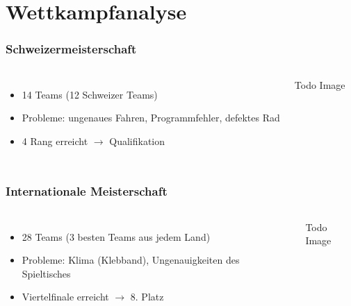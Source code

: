 \section{Wettkampfanalyse}

%	

\begin{frame}
	\frametitle{Schweizermeisterschaft}
	
	\begin{columns}[t]
		\begin{itemize}
			\item 14 Teams (12 Schweizer Teams)
			\item Probleme: ungenaues Fahren, Programmfehler, defektes Rad
			\item 4 Rang erreicht $\rightarrow$ Qualifikation
		\end{itemize}
		Todo Image
	\end{columns}
	
\end{frame}

\begin{frame}
	\frametitle{Internationale Meisterschaft}
	
	\begin{columns}[t]
		\begin{itemize}
			\item 28 Teams (3 besten Teams aus jedem Land)
			\item Probleme: Klima (Klebband), Ungenauigkeiten des Spieltisches
			\item Viertelfinale erreicht $\rightarrow$ 8. Platz
		\end{itemize}
		Todo Image
	\end{columns}
	
\end{frame}